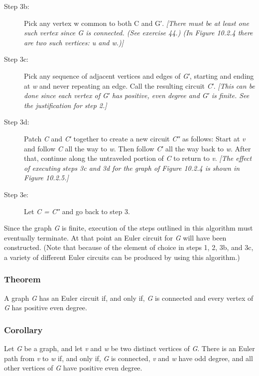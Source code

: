 \documentclass{article}
\begin{document}
\begin{description}
\begin{description}
    \item[Step 3b: ] Pick any vertex w common to both C and G′.
    \textit{[There must be at least one such vertex since G is connected. (See exercise 44.) (In Figure 10.2.4 there are two such vertices: u and w.)]}

    \item[Step 3c: ] Pick any sequence of adjacent vertices and edges of \textit{G′}, starting and ending at \textit{w} and never repeating an edge. Call the resulting circuit \textit{C′}.
    \textit{[This can be done since each vertex of G′ has positive, even degree and G′ is finite. See the justification for step 2.]}

    \item[Step 3d: ] Patch \textit{C} and \textit{C′} together to create a new circuit \textit{C′′} as follows: Start at \textit{v} and follow \textit{C} all the way to \textit{w}. Then follow \textit{C′} all the way back to \textit{w}. After that, continue along the untraveled portion of \textit{C} to return to \textit{v}.
    \textit{[The effect of executing steps 3c and 3d for the graph of Figure 10.2.4 is shown in Figure 10.2.5.]}

    \item[Step 3e: ] Let \textit{C = C′′} and go back to step 3.
    \end{description}
\end{description}

Since the graph \textit{G} is finite, execution of the steps outlined in this algorithm must eventually terminate. At that point an Euler circuit for \textit{G} will have been constructed. (Note that because of the element of choice in steps 1, 2, 3b, and 3c, a variety of different Euler circuits can be produced by using this algorithm.)

\subsubsection{Theorem}
A graph \textit{G} has an Euler circuit if, and only if, \textit{G} is connected and every vertex of \textit{G} has positive even degree.

\subsubsection{Corollary}
Let \textit{G} be a graph, and let \textit{v} and \textit{w} be two distinct vertices of \textit{G}. There is an Euler path from \textit{v} to \textit{w} if, and only if, \textit{G} is connected, \textit{v} and \textit{w} have odd degree, and all other vertices of \textit{G} have positive even degree.
\end{document}
